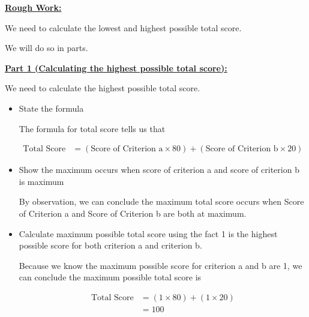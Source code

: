\documentclass[12pt]{article}
\begin{document}
\begin{mdframed}
    \underline{\textbf{Rough Work:}}

    \bigskip

    We need to calculate the lowest and highest possible total score.

    \bigskip

    We will do so in parts.

    \bigskip

    \underline{\textbf{Part 1 (Calculating the highest possible total score):}}

    \bigskip

    We need to calculate the highest possible total score.

    \bigskip

    \begin{itemize}
        \item State the formula

        \begin{mdframed}
        The formula for total score tells us that

        \begin{align}
            \text{Total Score} &= (\text{Score of Criterion a} \times 80) + (\text{Score of Criterion b} \times 20)
        \end{align}
        \end{mdframed}

        \item Show the maximum occurs when score of criterion a and score of criterion b is maximum

        \begin{mdframed}
        By observation, we can conclude the maximum total score occurs when Score of Criterion a
        and Score of Criterion b are both at maximum.
        \end{mdframed}

        \item Calculate maximum possible total score using the fact 1 is the highest possible score
        for both criterion a and criterion b.

        \begin{mdframed}
        Because we know the maximum possible score for criterion a and b are 1,
        we can conclude the maximum possible total score is

        \begin{align}
            \text{Total Score} &= (1 \times 80) + (1 \times 20)\\
            &= 100
        \end{align}


\end{mdframed}
\end{itemize}
\end{mdframed}
\end{document}
